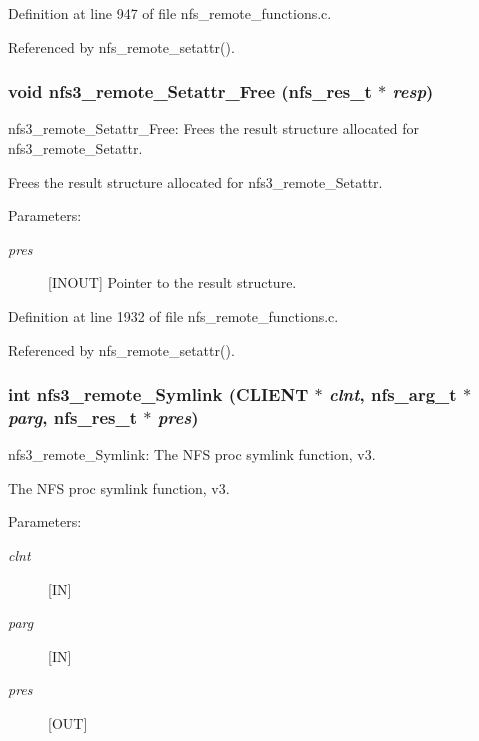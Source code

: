 Definition at line 947 of file nfs\_\-remote\_\-functions.c.

Referenced by nfs\_\-remote\_\-setattr().
\subsubsection{\setlength{\rightskip}{0pt plus 5cm}void nfs3\_\-remote\_\-Setattr\_\-Free (nfs\_\-res\_\-t $\ast$ {\em resp})}\label{group__NFSprocs_ga74}


nfs3\_\-remote\_\-Setattr\_\-Free: Frees the result structure allocated for nfs3\_\-remote\_\-Setattr.

Frees the result structure allocated for nfs3\_\-remote\_\-Setattr.

\begin{Desc}
\item[Parameters:]
\begin{description}
\item[{\em pres}][INOUT] Pointer to the result structure. \end{description}
\end{Desc}


Definition at line 1932 of file nfs\_\-remote\_\-functions.c.

Referenced by nfs\_\-remote\_\-setattr().
\subsubsection{\setlength{\rightskip}{0pt plus 5cm}int nfs3\_\-remote\_\-Symlink (CLIENT $\ast$ {\em clnt}, nfs\_\-arg\_\-t $\ast$ {\em parg}, nfs\_\-res\_\-t $\ast$ {\em pres})}\label{group__NFSprocs_ga29}


nfs3\_\-remote\_\-Symlink: The NFS proc symlink function, v3.

The NFS proc symlink function, v3.

\begin{Desc}
\item[Parameters:]
\begin{description}
\item[{\em clnt}][IN] \item[{\em parg}][IN] \item[{\em pres}][OUT] \end{description}
\end{Desc}


